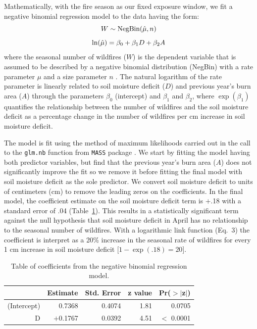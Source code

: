 \documentclass[12pt]{iopart}
\begin{document}
Mathematically, with the fire season as our fixed exposure window, we fit a negative binomial regression model to the data having the form:
\begin{equation}
    W  \sim \hbox{NegBin}(\hat \mu, n) 
\end{equation}
\begin{equation}
    \ln(\hat \mu) = \beta_0 + \beta_1 D + \beta_2 A \\
\end{equation} 
\noindent where the seasonal number of wildfires ($W$) is the dependent variable that is assumed to be described by a negative binomial distribution (NegBin) with a rate parameter $\mu$ and a size parameter $n$ \citep{Hilbe2011}. The natural logarithm of the rate parameter is linearly related to soil moisture deficit ($D$) and previous year's burn area ($A$) through the parameters $\beta_0$ (intercept) and $\beta_1$ and $\beta_2$, where $\exp(\beta_1)$ quantifies the relationship between the number of wildfires and the soil moisture deficit as a percentage change in the number of wildfires per cm increase in soil moisture deficit. 

The model is fit using the method of maximum likelihoods carried out in the call to the \texttt{glm.nb} function from \texttt{MASS} package \citep{VenablesRipley2002}. We start by fitting the model having both predictor variables, but find that the previous year's burn area ($A$) does not significantly improve the fit so we remove it before fitting the final model with soil moisture deficit as the sole predictor. We convert soil moisture deficit to units of centimeters (cm) to remove the leading zeros on the coefficients. In the final model, the coefficient estimate on the soil moisture deficit term is $+$.18 with a standard error of .04 (Table~\ref{Coefficients}). This results in a statistically significant term against the null hypothesis that soil moisture deficit in April has no relationship to the seasonal number of wildfires. With a logarithmic link function (Eq.~3) the coefficient is interpret as a 20\% increase in the seasonal rate of wildfires for every 1 cm increase in soil moisture deficit [$1 - \exp(.18) = 20$]. 
\begin{table}[ht]
\centering
\begin{tabular}{rrrrr}
  \hline
 & Estimate & Std. Error & z value & Pr($>$$|$z$|$) \\ 
  \hline
(Intercept) & 0.7368 & 0.4074 & 1.81 & 0.0705 \\ 
  D & $+$0.1767 & 0.0392 & 4.51 & $<$ 0.0001 \\ 
   \hline
\end{tabular}
\caption{\label{Coefficients} Table of coefficients from the negative binomial regression model.}
\end{table}
\end{document}
